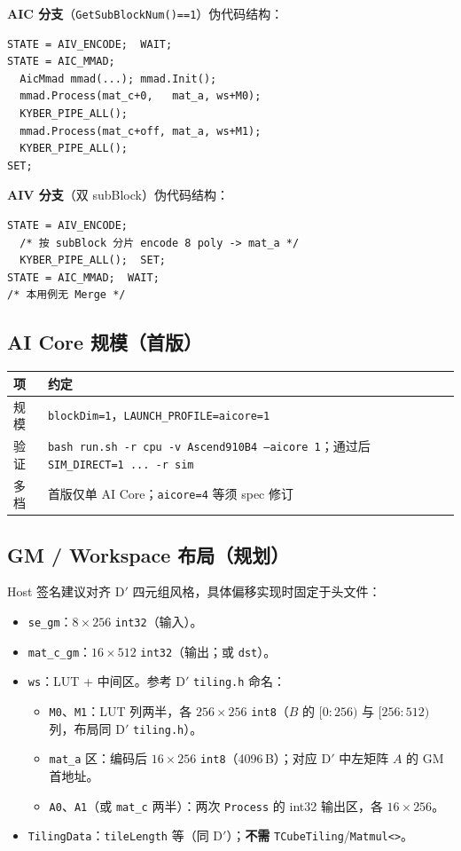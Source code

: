 \documentclass[UTF8,a4paper,11pt]{ctexart}
\begin{document}
\textbf{AIC 分支}（\texttt{GetSubBlockNum()==1}）伪代码结构：
\begin{verbatim}
STATE = AIV_ENCODE;  WAIT;
STATE = AIC_MMAD;
  AicMmad mmad(...); mmad.Init();
  mmad.Process(mat_c+0,   mat_a, ws+M0);
  KYBER_PIPE_ALL();
  mmad.Process(mat_c+off, mat_a, ws+M1);
  KYBER_PIPE_ALL();
SET;
\end{verbatim}

\textbf{AIV 分支}（双 subBlock）伪代码结构：
\begin{verbatim}
STATE = AIV_ENCODE;
  /* 按 subBlock 分片 encode 8 poly -> mat_a */
  KYBER_PIPE_ALL();  SET;
STATE = AIC_MMAD;  WAIT;
/* 本用例无 Merge */
\end{verbatim}

\subsection{AI Core 规模（首版）}
\begin{longtable}{@{}L{2.8cm}L{10.5cm}@{}}
\toprule
项 & 约定 \\
\midrule
规模 & \texttt{blockDim=1}，\texttt{LAUNCH\_PROFILE=aicore=1} \\
验证 & \texttt{bash run.sh -r cpu -v Ascend910B4 --aicore 1}；通过后 \texttt{SIM\_DIRECT=1 ... -r sim} \\
多档 & 首版仅单 AI Core；\texttt{aicore=4} 等须 spec 修订 \\
\bottomrule
\end{longtable}

\subsection{GM / Workspace 布局（规划）}
Host 签名建议对齐 D$'$ 四元组风格，具体偏移实现时固定于头文件：
\begin{itemize}
  \item \texttt{se\_gm}：$8\times 256$ \texttt{int32}（输入）。
  \item \texttt{mat\_c\_gm}：$16\times 512$ \texttt{int32}（输出；或 \texttt{dst}）。
  \item \texttt{ws}：LUT + 中间区。参考 D$'$ \texttt{tiling.h} 命名：
  \begin{itemize}
    \item \texttt{M0}、\texttt{M1}：LUT 列两半，各 $256\times 256$ \texttt{int8}（$B$ 的 $[0:256)$ 与 $[256:512)$ 列，布局同 D$'$ \texttt{tiling.h}）。
    \item \texttt{mat\_a} 区：编码后 $16\times 256$ \texttt{int8}（4096\,B）；对应 D$'$ 中左矩阵 $A$ 的 GM 首地址。
    \item \texttt{A0}、\texttt{A1}（或 \texttt{mat\_c} 两半）：两次 \texttt{Process} 的 int32 输出区，各 $16\times 256$。
  \end{itemize}
  \item \texttt{TilingData}：\texttt{tileLength} 等（同 D$'$）；\textbf{不需} \texttt{TCubeTiling}/\texttt{Matmul<>}。
\end{itemize}
\end{document}
